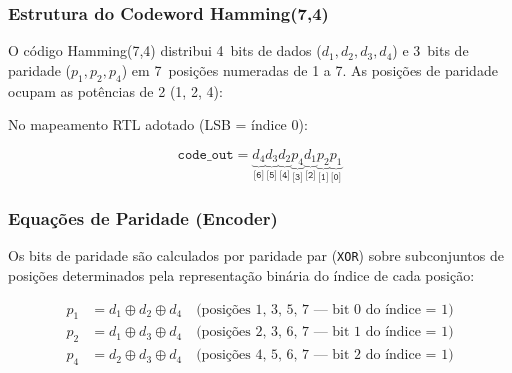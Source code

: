\documentclass[12pt,a4paper]{article}
\begin{document}
\subsubsection{Estrutura do Codeword Hamming(7,4)}

O código Hamming(7,4) distribui 4~bits de dados ($d_1, d_2, d_3, d_4$) e 3~bits de paridade ($p_1, p_2, p_4$) em 7~posições numeradas de 1 a 7. As posições de paridade ocupam as potências de 2 (1, 2, 4):

\begin{center}
\end{center}

No mapeamento RTL adotado (LSB = índice 0):

\[
\texttt{code\_out} = \underbrace{d_4}_{\texttt{[6]}}
                    \underbrace{d_3}_{\texttt{[5]}}
                    \underbrace{d_2}_{\texttt{[4]}}
                    \underbrace{p_4}_{\texttt{[3]}}
                    \underbrace{d_1}_{\texttt{[2]}}
                    \underbrace{p_2}_{\texttt{[1]}}
                    \underbrace{p_1}_{\texttt{[0]}}
\]

\subsubsection{Equações de Paridade (Encoder)}

Os bits de paridade são calculados por paridade par (\texttt{XOR}) sobre subconjuntos de posições determinados pela representação binária do índice de cada posição:

\begin{align}
  p_1 &= d_1 \oplus d_2 \oplus d_4
        \quad\text{(posições 1, 3, 5, 7 --- bit~0 do índice = 1)} \label{eq:p1}\\
  p_2 &= d_1 \oplus d_3 \oplus d_4
        \quad\text{(posições 2, 3, 6, 7 --- bit~1 do índice = 1)} \label{eq:p2}\\
  p_4 &= d_2 \oplus d_3 \oplus d_4
        \quad\text{(posições 4, 5, 6, 7 --- bit~2 do índice = 1)} \label{eq:p4}
\end{align}
\end{document}
